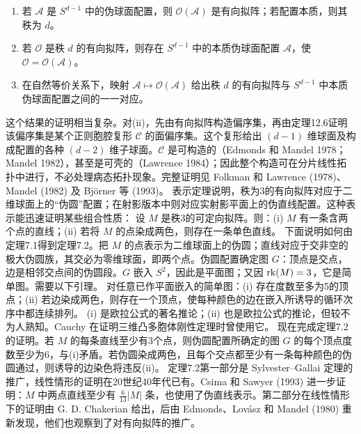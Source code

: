 \begin{enumerate}[label=(\roman*)]
\item 若 $\mathcal A$ 是 $S^{d-1}$ 中的伪球面配置，则 $\mathcal O(\mathcal A)$ 是有向拟阵；若配置本质，则其秩为 $d$。
\item 若 $\mathcal O$ 是秩 $d$ 的有向拟阵，则存在 $S^{d-1}$ 中的本质伪球面配置 $\mathcal A$，使 $\mathcal O=\mathcal O(\mathcal A)$。
\item 在自然等价关系下，映射 $\mathcal A\mapsto\mathcal O(\mathcal A)$ 给出秩 $d$ 的有向拟阵与 $S^{d-1}$ 中本质伪球面配置之间的一一对应。
\end{enumerate}
这个结果的证明相当复杂。对(ii)，先由有向拟阵构造偏序集，再由定理12.6证明该偏序集是某个正则胞腔复形 $\mathcal C$ 的面偏序集。这个复形给出 $(d-1)$ 维球面及构成配置的各种 $(d-2)$ 维子球面。$\mathcal C$ 是可构造的（Edmonds 和 Mandel 1978；Mandel 1982），甚至是可壳的（Lawrence 1984）；因此整个构造可在分片线性拓扑中进行，不必处理病态拓扑现象。完整证明见 Folkman 和 Lawrence (1978)、Mandel (1982) 及 Björner 等 (1993)。
表示定理说明，秩为3的有向拟阵对应于二维球面上的“伪圆”配置；在射影版本中则对应实射影平面上的伪直线配置。这种表示能迅速证明某些组合性质：
设 $M$ 是秩3的可定向拟阵。则：(i) $M$ 有一条含两个点的直线；(ii) 若将 $M$ 的点染成两色，则存在一条单色直线。
下面说明如何由定理7.1得到定理7.2。把 $M$ 的点表示为二维球面上的伪圆；直线对应于交非空的极大伪圆族，其交必为零维球面，即两个点。伪圆配置确定图 $G$：顶点是交点，边是相邻交点间的伪圆段。$G$ 嵌入 $S^2$，因此是平面图；又因 $\operatorname{rk}(M)=3$，它是简单图。需要以下引理。
对任意已作平面嵌入的简单图：(i) 存在度数至多为5的顶点；(ii) 若边染成两色，则存在一个顶点，使每种颜色的边在嵌入所诱导的循环次序中都连续排列。
(i) 是欧拉公式的著名推论；(ii) 也是欧拉公式的推论，但较不为人熟知。Cauchy 在证明三维凸多胞体刚性定理时曾使用它。
现在完成定理7.2的证明。若 $M$ 的每条直线至少有3个点，则伪圆配置所确定的图 $G$ 的每个顶点度数至少为6，与(i)矛盾。若伪圆染成两色，且每个交点都至少有一条每种颜色的伪圆通过，则诱导的边染色将违反(ii)。
定理7.2第一部分是 Sylvester--Gallai 定理的推广，线性情形的证明在20世纪40年代已有。Csima 和 Sawyer (1993) 进一步证明：$M$ 中两点直线至少有 $\frac6{13}|M|$ 条，也使用了伪直线表示。第二部分在线性情形下的证明由 G. D. Chakerian 给出，后由 Edmonds、Lovász 和 Mandel (1980) 重新发现，他们也观察到了对有向拟阵的推广。
